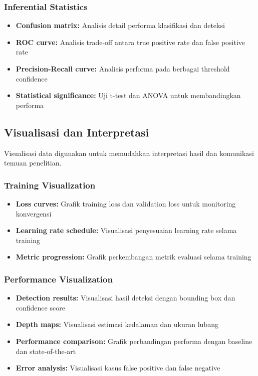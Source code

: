 \documentclass[12pt,a4paper]{report}
\begin{document}
\subsubsection{Inferential Statistics}

\begin{itemize}
    \item \textbf{Confusion matrix:} Analisis detail performa klasifikasi dan deteksi
    \item \textbf{ROC curve:} Analisis trade-off antara true positive rate dan false positive rate
    \item \textbf{Precision-Recall curve:} Analisis performa pada berbagai threshold confidence
    \item \textbf{Statistical significance:} Uji t-test dan ANOVA untuk membandingkan performa
\end{itemize}

\subsection{Visualisasi dan Interpretasi}

Visualisasi data digunakan untuk memudahkan interpretasi hasil dan komunikasi temuan penelitian.

\subsubsection{Training Visualization}

\begin{itemize}
    \item \textbf{Loss curves:} Grafik training loss dan validation loss untuk monitoring konvergensi
    \item \textbf{Learning rate schedule:} Visualisasi penyesuaian learning rate selama training
    \item \textbf{Metric progression:} Grafik perkembangan metrik evaluasi selama training
\end{itemize}

\subsubsection{Performance Visualization}

\begin{itemize}
    \item \textbf{Detection results:} Visualisasi hasil deteksi dengan bounding box dan confidence score
    \item \textbf{Depth maps:} Visualisasi estimasi kedalaman dan ukuran lubang
    \item \textbf{Performance comparison:} Grafik perbandingan performa dengan baseline dan state-of-the-art
    \item \textbf{Error analysis:} Visualisasi kasus false positive dan false negative
\end{itemize}
\end{document}
